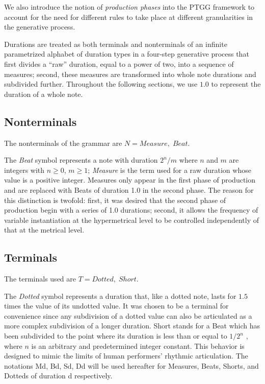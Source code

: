 \documentclass{article}
\begin{document}
We also introduce the notion of \emph{production phases} into the PTGG framework to account for the need for different rules to take place at different granularities in the generative process.

Durations are treated as both terminals and nonterminals of an infinite parametrized alphabet of duration types in a four-step generative process that first divides a “raw” duration, equal to a power of two, into a sequence of measures; second, these measures are transformed into whole note durations and subdivided further. Throughout the following sections, we use $1.0$ to represent the duration of a whole note.

\subsection{Nonterminals}

The nonterminals of the grammar are $N={Measure, \; Beat}$. 

The \emph{Beat} symbol represents a note with duration $2^n/m$ where $n$ and $m$ are integers with $n \geq 0$, $m \geq 1$; \emph{Measure} is the term used for a raw duration whose value is a positive integer. Measures only appear in the first phase of production and are replaced with Beats of duration 1.0 in the second phase. The reason for this distinction is twofold: first, it was desired that the second phase of production begin with a series of 1.0 durations; second, it allows the frequency of variable instantiation at the hypermetrical level to be controlled independently of that at the metrical level.


\subsection{Terminals}

The terminals used are $T={Dotted, \; Short}$.

The \emph{Dotted} symbol represents a duration that, like a dotted note, lasts for $1.5$ times the value of its undotted value. It was chosen to be a terminal for convenience since any subdivision of a dotted value can also be articulated as a more complex subdivision of a longer duration. Short stands for a Beat which has been subdivided to the point where its duration is less than or equal to $1/2^n$ , where $n$ is an arbitrary and predetermined integer constant. This behavior is designed to mimic the limits of human performers’ rhythmic articulation. The notations Md, Bd, Sd, Dd will be used hereafter for Measures, Beats, Shorts, and Dotteds of duration d respectively.
\end{document}
